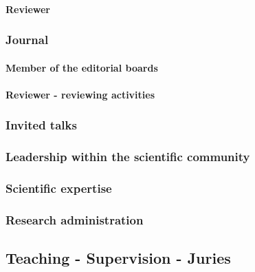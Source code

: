 \paragraph{Reviewer}
\label{DIVERSE:animation-eventselect-review}

\subsubsection{Journal}
\label{DIVERSE:animation-journal}

\paragraph{Member of the editorial boards}
\label{DIVERSE:animation-journal-board}

\paragraph{Reviewer - reviewing activities}
\label{DIVERSE:animation-journal-review}

\subsubsection{Invited talks}
\label{DIVERSE:animation-talks}

\subsubsection{Leadership within the scientific community}
\label{DIVERSE:animation-leadership}

\subsubsection{Scientific expertise}
\label{DIVERSE:animation-expertise}

\subsubsection{Research administration}
\label{DIVERSE:animation-admin}

\subsection{Teaching - Supervision - Juries}
\label{DIVERSE:teaching}
